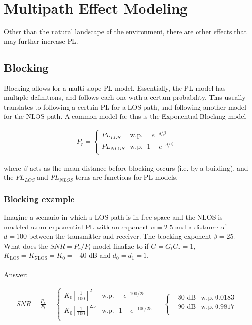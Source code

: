 \documentclass[12pt]{report} %
\begin{document}
\chapter{Multipath Effect Modeling}
Other than the natural landscape of the environment, there are other effects
that may further increase \gls{PL}.

\section{Blocking}
Blocking allows for a multi-slope \gls{PL} model. Essentially, the \gls{PL}
model has multiple definitions, and follows each one with a certain probability.
This usually translates to following a certain \gls{PL} for a \gls{LOS} path,
and following another model for the \gls{NLOS} path. A common model for this is
the Exponential Blocking model

\begin{align}
  \label{eq:exp_blocking}
  P_r = \left\{ \begin{array}{ll}
                  PL_{LOS}  & \text{w.p.} ~~~~~~ e^{-d/\beta}  \\
                  PL_{NLOS} & \text{w.p.} ~~~ 1 - e^{-d/\beta} \\
                \end{array}
  \right.
\end{align}

where $\beta$ acts as the mean distance before blocking occurs (i.e. by a building), and the $PL_{LOS}$ and $PL_{NLOS}$ terns are functions for \gls{PL} models.

\subsection*{Blocking example}
Imagine a scenario in which a \gls{LOS} path is in free space and the \gls{NLOS}
is modeled as an exponential \gls{PL} with an exponent $\alpha = 2.5$ and a
distance of $d = 100$ between the transmitter and receiver. The blocking
exponent $\beta = 25$. What does the $SNR = P_r/P_t$ model finalize to if $G =
  G_t G_r = 1$, $K_{\text{LOS}} = K_{\text{NLOS}} = K_0 = -40$ dB and $d_0 = d_1 =
  1$.
\\
\\
Answer:

\begin{align}
  SNR = \frac{P_r}{P_t} = \left\{ \begin{array}{ll}
                                    K_0 \left[\frac{1}{100}\right]^2     & \text{w.p.} ~~~~~~ e^{-100/25}  \\
                                    K_0 \left[\frac{1}{100}\right]^{2.5} & \text{w.p.} ~~~ 1 - e^{-100/25} \\
                                  \end{array}
  \right. \nonumber
  = \left\{ \begin{array}{ll}
              -80 \text{ dB} & \text{w.p.} ~ 0.0183 \\
              -90 \text{ dB} & \text{w.p.} ~ 0.9817 \\
            \end{array}
  \right. \nonumber
\end{align}
\end{document}

